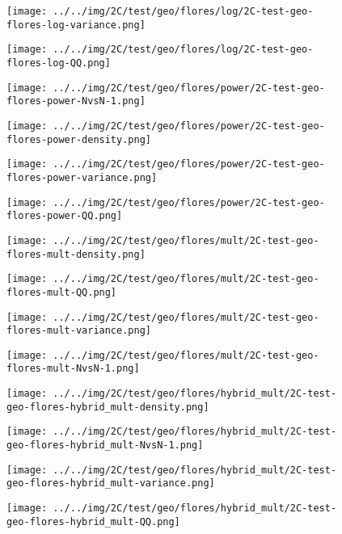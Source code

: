 \begin{figure}[H]
\centering	\texttt{[image: ../../img/2C/test/geo/flores/log/2C-test-geo-flores-log-variance.png]}
\end{figure}
\begin{figure}[H]
\centering	\texttt{[image: ../../img/2C/test/geo/flores/log/2C-test-geo-flores-log-QQ.png]}
\end{figure}
\begin{figure}[H]
\centering	\texttt{[image: ../../img/2C/test/geo/flores/power/2C-test-geo-flores-power-NvsN-1.png]}
\end{figure}
\begin{figure}[H]
\centering	\texttt{[image: ../../img/2C/test/geo/flores/power/2C-test-geo-flores-power-density.png]}
\end{figure}
\begin{figure}[H]
\centering	\texttt{[image: ../../img/2C/test/geo/flores/power/2C-test-geo-flores-power-variance.png]}
\end{figure}
\begin{figure}[H]
\centering	\texttt{[image: ../../img/2C/test/geo/flores/power/2C-test-geo-flores-power-QQ.png]}
\end{figure}
\begin{figure}[H]
\centering	\texttt{[image: ../../img/2C/test/geo/flores/mult/2C-test-geo-flores-mult-density.png]}
\end{figure}
\begin{figure}[H]
\centering	\texttt{[image: ../../img/2C/test/geo/flores/mult/2C-test-geo-flores-mult-QQ.png]}
\end{figure}
\begin{figure}[H]
\centering	\texttt{[image: ../../img/2C/test/geo/flores/mult/2C-test-geo-flores-mult-variance.png]}
\end{figure}
\begin{figure}[H]
\centering	\texttt{[image: ../../img/2C/test/geo/flores/mult/2C-test-geo-flores-mult-NvsN-1.png]}
\end{figure}
\begin{figure}[H]
\centering	\texttt{[image: ../../img/2C/test/geo/flores/hybrid\_mult/2C-test-geo-flores-hybrid\_mult-density.png]}
\end{figure}
\begin{figure}[H]
\centering	\texttt{[image: ../../img/2C/test/geo/flores/hybrid\_mult/2C-test-geo-flores-hybrid\_mult-NvsN-1.png]}
\end{figure}
\begin{figure}[H]
\centering	\texttt{[image: ../../img/2C/test/geo/flores/hybrid\_mult/2C-test-geo-flores-hybrid\_mult-variance.png]}
\end{figure}
\begin{figure}[H]
\centering	\texttt{[image: ../../img/2C/test/geo/flores/hybrid\_mult/2C-test-geo-flores-hybrid\_mult-QQ.png]}
\end{figure}
